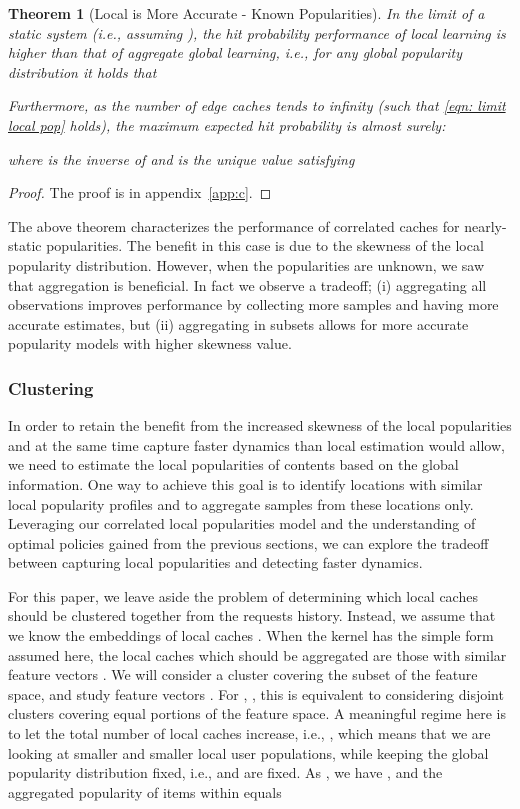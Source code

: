 \documentclass[10pt, conference, letterpaper]{IEEEtran}
\newtheorem{theorem}{Theorem}
\begin{document}
\begin{theorem}[Local is More Accurate - Known Popularities]\label{th:corr}
In the limit of a static system (i.e., assuming ), the hit probability performance of local learning is higher than that of aggregate global learning, i.e., for any global popularity distribution  it holds that


Furthermore, 
as the number of edge caches  tends to infinity (such that \eqref{eqn: limit local pop} holds), the maximum expected hit probability  is almost surely:

where  is the inverse of  and  is the unique value satisfying

\end{theorem}
\begin{proof}
The proof is in appendix~\ref{app:c}.
\end{proof}




The above theorem characterizes the performance of correlated caches for nearly-static popularities.
The benefit in this case is due to the skewness of the local popularity distribution. 
However, when the popularities are unknown, we saw that aggregation is beneficial. In fact we observe a tradeoff; (i) aggregating all observations improves performance by collecting more samples and having more accurate estimates, but (ii) aggregating in subsets allows for more accurate popularity models with higher skewness value. 
\subsubsection{Clustering}
In order to retain the benefit from the increased skewness of the local popularities and at the same time  capture faster dynamics than local estimation would allow, we need to estimate the local popularities of contents based on the global information. One way to achieve this goal is to identify locations with similar local popularity profiles and to aggregate samples from these locations only. Leveraging our correlated local popularities model and the understanding of optimal policies gained from the previous sections, we can explore the tradeoff between capturing local popularities and detecting faster dynamics.

For this paper, we leave aside the problem of determining which local caches should be clustered together from the requests history. Instead, we assume that we know the embeddings of local caches . When the kernel  has the simple form assumed here, the local caches which should be aggregated are those with similar feature vectors . 
We will consider a cluster  covering the subset  of the feature space, and study feature vectors .
For , , this is equivalent to considering  disjoint clusters covering equal portions of the feature space.
 A meaningful regime here is to let the total number of local caches  increase, i.e., , which means that we are looking at smaller and smaller local user populations, while keeping the global popularity distribution fixed, i.e.,  and  are fixed. As , we have , and the aggregated popularity of items  within  equals
\end{document}
